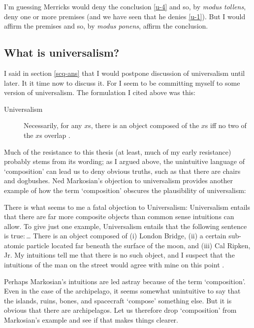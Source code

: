 \documentclass[11pt]{article}
\newenvironment{squote}{%
\begin{spacing}{1}
       	\begin{list}{}{%
\setlength{\labelwidth}{0pt}%
\rightmargin\leftmargin%
}
\item\relax
}{%
\end{list}%
\end{spacing}
}
\begin{document}
\begin{spacing}{1.25}
I'm guessing Merricks would deny the conclusion \ref{u-4} and so, by
{\em modus tollens}, deny one or more premises (and we have seen that
he denies \ref{u-1}).  But I would affirm the premises and so, by {\em
  modus ponens}, affirm the conclusion.

\subsection{What is universalism?}
I said in section \ref{scq-ans} that I would postpone discussion of
universalism until later.  It it time now to discuss it.  For I seem
to be committing myself to some version of universalism.  The
formulation I cited above was this:

\begin{description}
\item[Universalism] Necessarily, for any $x$s, there is an object
  composed of the $x$s iff no two of the $x$s overlap
  \citep[227]{markosian1998a}.
\end{description}

Much of the resistance to this thesis (at least, much of my early
resistance) probably stems from its wording; as I argued above, the
unintuitive language of `composition' can lead us to deny obvious
truths, such as that there are chairs and dogbushes.  Ned Markosian's
objection to universalism provides another example of how the term
`composition' obscures the plausibility of universalism:

\begin{squote}
There is what seems to me a fatal objection to Universalism:
Universalism entails that there are far more composite objects than
common sense intuitions can allow.  To give just one example,
Universalism entails that the following sentence is true:\,\ldots
There is an object composed of (i) London Bridge, (ii) a certain
sub-atomic particle located far beneath the surface of the moon, and
(iii) Cal Ripken, Jr.  My intuitions tell me that there is no such
object, and I suspect that the intuitions of the man on the street
would agree with mine on this point \citeyearpar[228]{markosian1998a}.
\end{squote}

Perhaps Markosian's intuitions are led astray because of the term
`composition'.  Even in the case of the archipelago, it seems somewhat
unintuitive to say that the islands, ruins, bones, and spacecraft
`compose' something else.  But it is obvious that there are
archipelagos.  Let us therefore drop `composition' from Markosian's
example and see if that makes things clearer.


\end{spacing}
\end{document}
